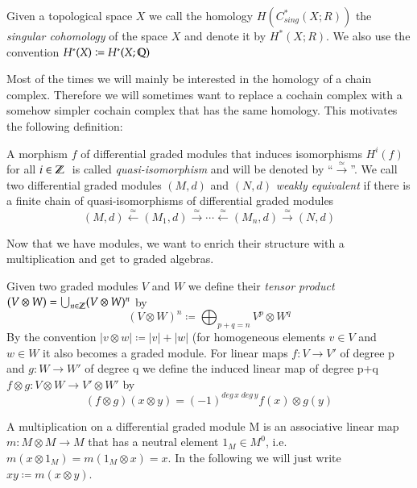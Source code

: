 \begin{Example}
 Given a topological space $X$ we call the homology $H(C^*_{sing}(X;R))$ the \emph{singular cohomology} of the space $X$
 and denote it by $H^*(X;R)$. We also use the convention $H^*(X) \coloneqq H^*(X; \mathbb{Q})$	
\end{Example}


Most of the times we will mainly be interested in the homology of a chain complex. Therefore we will sometimes want to replace
a cochain complex with a somehow simpler cochain complex that has the same homology. This motivates the following definition:

\begin{Definition}
 A morphism $f$ of differential graded modules that induces isomorphisms $H^i(f)$ for all $i \in \mathbb{Z} \;$ is called \emph{quasi-isomorphism} and will
 be denoted by ``$\overset{\simeq}{\longrightarrow}$''. \newline
 We call two differential graded modules $(M,d)$ and $(N,d)$ \emph{weakly equivalent} if there is a finite chain of quasi-isomorphisms of differential
 graded modules
 $$ (M,d) \overset{\simeq}{\leftarrow} (M_1,d) \overset{\simeq}{\rightarrow} \cdots 
 \overset{\simeq}{\leftarrow} (M_n,d) \overset{\simeq}{\rightarrow} (N,d)$$
\end{Definition}


Now that we have modules, we want to enrich their structure with a multiplication and get to graded algebras.

\begin{Definition}
 Given two graded modules $V$ and $W$ we define their \emph{tensor product} \newline
 ${(V \otimes W) = \bigcup_{n \in \mathbb{Z}} (V \otimes W)^n }$ by 
 $$ (V \otimes W)^n \coloneqq \bigoplus_{p + q = n} V^p \otimes W^q$$
 By the convention $|v \otimes w| \coloneqq |v| + |w|$ (for homogeneous elements $v \in V$ and $w \in W$
 it also becomes a graded module. \newline
 For linear maps $f \colon V \to V'$ of degree p and $g \colon W \to W'$ of degree q we define the induced linear map
 of degree p+q \;  ${f \otimes g \colon V \otimes W \to V' \otimes W'}$ by
 $$ (f \otimes g) ( x \otimes y) = (-1)^{deg \, x \; deg \,y} f(x) \otimes g(y) $$

 A multiplication on a differential graded module M is an associative linear map \newline
 ${m \colon M \otimes M \to M }$ that has a neutral element $1_M \in M^0$, i.e. $m(x \otimes 1_M) = m(1_M \otimes x) = x$.
 In the following we will just write $xy \coloneqq m(x \otimes y)$.
 \end{Definition}

